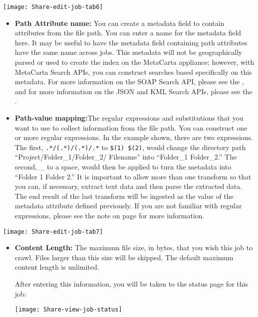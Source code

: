 \texttt{[image: Share-edit-job-tab6]}

\begin{itemize}

\item \textbf{Path Attribute name:} You can create a metadata field
to contain attributes from the file path. You can enter a name
for the metadata field here. It may be useful to have the metadata
field containing path attributes have the same name across jobs.
This metadata will not be geographically parsed or used to create the
index on the MetaCarta appliance; however, with MetaCarta Search APIs,
you can construct searches based specifically on this metadata. For more
information on the SOAP Search API, please see the , and for more information on the JSON and KML
Search APIs, please see the .

\item \textbf{Path-value mapping:}The regular expressions and
substitutions that you want to use to collect information from the
file path. You can construct one or more regular expressions. In the
example shown, there are two expressions. The first,
\verb+.*/(.*)/(.*)/.*+ to \verb+$(1) $(2)+, would change the directory
path ``Project/Folder\_1/Folder\_2/ Filename'' into ``Folder\_1
Folder\_2.'' The second, \_ to a space, would then be applied to turn
the metadata into ``Folder 1 Folder 2.'' It is important to allow more
than one transform so that you can, if necessary, extract text data
and then parse the extracted data. The end result of the last
transform will be ingested as the value of the metadata attribute
defined previously. \ifCombinedConnectorGuide If you are not familiar
with regular expressions, please see the note on page \pageref{regex}
for more information.\fi

\ifShareGuide 
\label{regex} 


\fi

\end{itemize}

\texttt{[image: Share-edit-job-tab7]}

\begin{itemize}

\item \textbf{Content Length:} The maximum file size, in bytes, that
you wish this job to crawl. Files larger than this size will be
skipped. The default maximum content length is unlimited.


After entering this information, you will be taken to the status page
for this job:

\texttt{[image: Share-view-job-status]}


\end{itemize}

